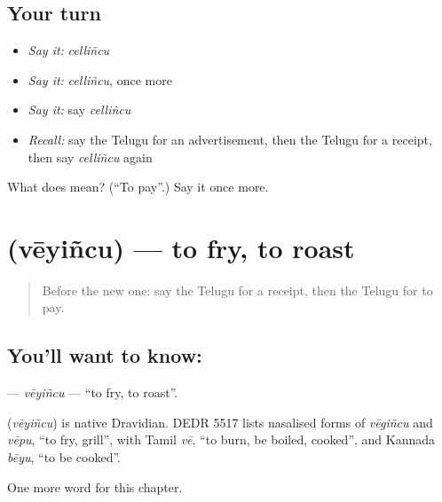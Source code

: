 \subsection*{Your turn}
\begin{itemize}
\raggedright
  \item \emph{Say it:} \emph{celliñcu}
  \item \emph{Say it:} \emph{celliñcu}, once more
  \item \emph{Say it:} say \emph{celliñcu}
  \item \emph{Recall:} say the Telugu for an advertisement, then the Telugu for a receipt, then say \emph{celliñcu} again
\end{itemize}

\begin{tcolorbox}[breakable,colback=teal!4,colframe=teal!35!black,title={Before you move on}]
What does  mean? (\textquotedblleft{}To pay\textquotedblright{}.) Say it once more.
\end{tcolorbox}
\section[\texorpdfstring{\te{వేయించు} (vēyiñcu)}{వేయించు (vēyiñcu)}]{ (vēyiñcu) — to fry, to roast}

\label{lesson:TE-C157-veyincu}



\begin{quote}
Before the new one: say the Telugu for a receipt, then the Telugu for to pay.
\end{quote}

\subsection*{You'll want to know: }
\textbf{} — \emph{vēyiñcu} — \textquotedblleft{}to fry, to roast\textquotedblright{}.

\begin{cousinweb}
\textbf{} (\emph{vēyiñcu}) is native Dravidian. DEDR 5517 lists nasalised forms of \emph{vēgiñcu} and \emph{vēpu}, \textquotedblleft{}to fry, grill\textquotedblright{}, with Tamil \emph{vē}, \textquotedblleft{}to burn, be boiled, cooked\textquotedblright{}, and Kannada \emph{bēyu}, \textquotedblleft{}to be cooked\textquotedblright{}.
\end{cousinweb}

\begin{grammarlens}[title={What you've built}]
One more word for this chapter.
\end{grammarlens}

